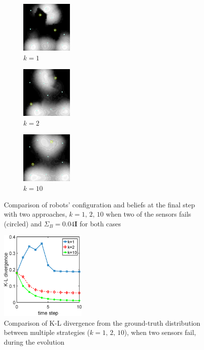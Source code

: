 \documentclass[journal]{IEEEtran}
\begin{document}
\begin{figure}
	\centering
	\begin{subfigure}[b]{0.15\textwidth}
		\centering
		\includegraphics[width=1in]{figure/fault_order_1_pdf}
		\caption{$k=1$}
	\end{subfigure}
	\begin{subfigure}[b]{0.15\textwidth}
		\centering
		\includegraphics[width=1in]{figure/fault_order_2_pdf}
		\caption{$k=2$}
	\end{subfigure}
	\begin{subfigure}[b]{0.15\textwidth}
	\centering
	\includegraphics[width=1in]{figure/fault_order_n_pdf}
	\caption{$k=10$}
\end{subfigure}
	\caption{Comparison of robots' configuration and beliefs at the final step with two approaches, $k=1, \,2,\,10$ when two of the sensors fails (circled) and $\Sigma_B = 0.04\mathbf{I}$ for both cases }
	\label{fig:fig6}
\end{figure}
\begin{figure}
	\centering
	\includegraphics[width=1.67in]{figure/fault_kl2}
	\caption{Comparison of K-L divergence from the ground-truth distribution between multiple strategies ($k=1,\,2,\,10$), when two sensors fail, during the evolution}
	\label{fig:fig7}
\end{figure}
\end{document}
